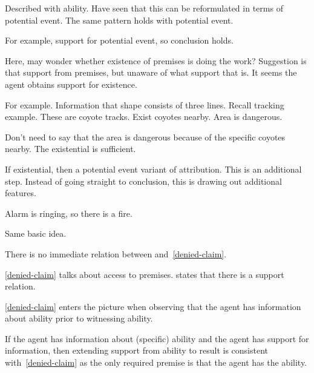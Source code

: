 \begin{note}
  Described \AR{} with ability.
  Have seen that this can be reformulated in terms of potential event.
  The same pattern holds with potential event.

  For example, support for potential event, so conclusion holds.
\end{note}

\begin{note}
  Here, may wonder whether existence of premises is doing the work?
  Suggestion is that support from premises, but unaware of what support that is.
  It seems the agent obtains support for existence.

  For example.
  Information that shape consists of three lines.
  Recall tracking example.
  These are coyote tracks.
  Exist coyotes nearby.
  Area is dangerous.

  Don't need to say that the area is dangerous because of the specific coyotes nearby.
  The existential is sufficient.
\end{note}

\begin{note}[No to existential]
  If existential, then a potential event variant of attribution.
  This is an additional step.
  Instead of going straight to conclusion, this is drawing out additional features.
\end{note}

\begin{note}
  Alarm is ringing, so there is a fire.

  Same basic idea.
\end{note}

\begin{note}
  There is no immediate relation between \AR{} and~\ref{denied-claim}.

  \ref{denied-claim} talks about access to premises.
  \AR{} states that there is a support relation.

  \ref{denied-claim} enters the picture when observing that the agent has information about ability prior to witnessing ability.

  If the agent has information about (specific) ability and the agent has support for information, then extending support from ability to result is consistent with~\ref{denied-claim} as the only required premise is that the agent has the ability.
\end{note}

